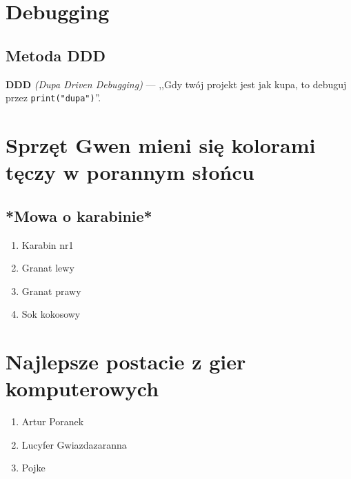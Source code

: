 \chapter{Debugging}
\section{Metoda DDD}

\textbf{DDD} \textsl{(Dupa Driven Debugging)} --- ,,Gdy twój projekt jest jak kupa, to debuguj przez \verb|print("dupa")|''.
\chapter{Sprzęt Gwen mieni się kolorami tęczy w porannym słońcu}
\section{*Mowa o karabinie*}

\begin{enumerate}
    \item Karabin nr1
    \item Granat lewy
    \item Granat prawy
    \item Sok kokosowy
\end{enumerate}

\chapter{Najlepsze postacie z gier komputerowych}
\begin{enumerate}
    \item Artur Poranek
    \item Lucyfer Gwiazdazaranna
    \item Pojke
\end{enumerate}




